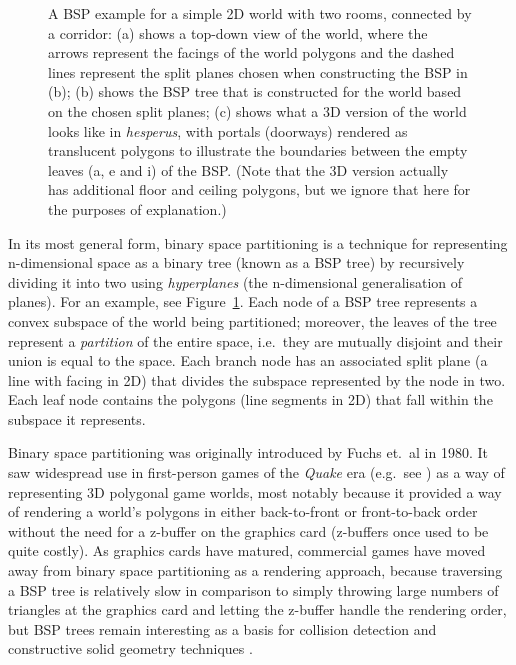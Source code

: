 \documentclass[10pt,twocolumn]{article}
\newenvironment{stusubfig}[1]
{
	\begin{figure}[#1]
	\begin{center}
}
{
	\end{center}
	\end{figure}
}
\begin{document}
\begin{stusubfig}{!t}
\caption{A BSP example for a simple 2D world with two rooms, connected by a corridor: (a) shows a top-down view of the world, where the arrows represent the facings of the world polygons and the dashed lines represent the split planes chosen when constructing the BSP in (b); (b) shows the BSP tree that is constructed for the world based on the chosen split planes; (c) shows what a 3D version of the world looks like in \emph{hesperus}, with portals (doorways) rendered as translucent polygons to illustrate the boundaries between the empty leaves (a, e and i) of the BSP. (Note that the 3D version actually has additional floor and ceiling polygons, but we ignore that here for the purposes of explanation.)}
\label{fig:bsp-example}
\end{stusubfig}

In its most general form, binary space partitioning is a technique for representing n-dimensional space as a binary tree (known as a BSP tree) by recursively dividing it into two using \emph{hyperplanes} (the n-dimensional generalisation of planes). For an example, see Figure~\ref{fig:bsp-example}. Each node of a BSP tree represents a convex subspace of the world being partitioned; moreover, the leaves of the tree represent a \emph{partition} of the entire space, i.e.~they are mutually disjoint and their union is equal to the space. Each branch node has an associated split plane (a line with facing in 2D) that divides the subspace represented by the node in two. Each leaf node contains the polygons (line segments in 2D) that fall within the subspace it represents.

Binary space partitioning was originally introduced by Fuchs et.\ al \cite{fuchs80} in 1980. It saw widespread use in first-person games of the \emph{Quake} era (e.g.~see \cite{abrash97}) as a way of representing 3D polygonal game worlds, most notably because it provided a way of rendering a world's polygons in either back-to-front or front-to-back order \cite{fuchs80,gordon91} without the need for a z-buffer on the graphics card (z-buffers once used to be quite costly). As graphics cards have matured, commercial games have moved away from binary space partitioning as a rendering approach, because traversing a BSP tree is relatively slow in comparison to simply throwing large numbers of triangles at the graphics card and letting the z-buffer handle the rendering order, but BSP trees remain interesting as a basis for collision detection and constructive solid geometry techniques \cite{ericson05,lysenko08}.
\end{document}
